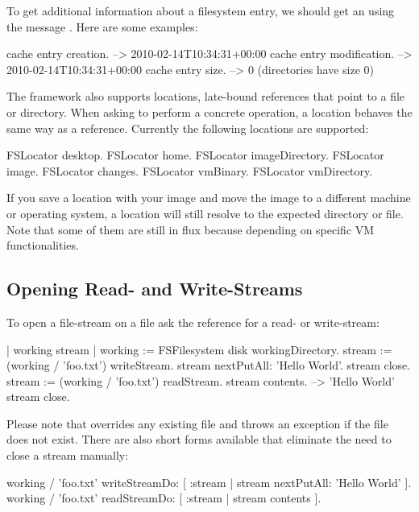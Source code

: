\documentclass[a4paper,10pt,twoside]{book}
\begin{document}
  
To get additional information about a filesystem entry, we should get an  using the message . Here are some examples:

\begin{code}{}
cache entry creation.		--> 2010-02-14T10:34:31+00:00
cache entry modification.	--> 2010-02-14T10:34:31+00:00
cache entry size.			--> 0 (directories have size 0)
\end{code} 

The framework also supports locations, late-bound references that point to a file or directory. When asking to perform a concrete operation, a location behaves the same way as a reference. Currently the following locations are supported:

\begin{code}{}
FSLocator desktop.
FSLocator home.
FSLocator imageDirectory.
FSLocator image.
FSLocator changes.
FSLocator vmBinary.
FSLocator vmDirectory.
\end{code} 

If you save a location with your image and move the image to a different machine or operating system, a location will still resolve to the expected directory or file. Note that some of them are still in flux because depending on specific VM functionalities. 

\subsection{Opening Read- and Write-Streams}
To open a file-stream on a file ask the reference for a read- or write-stream:

\begin{code}{}
| working stream |
working := FSFilesystem disk workingDirectory.
stream := (working / 'foo.txt') writeStream.
stream nextPutAll: 'Hello World'.
stream close.
stream := (working / 'foo.txt') readStream.
stream contents.			--> 'Hello World'
stream close.
\end{code}


Please note that  overrides any existing file and  throws an exception if the file does not exist. There are also short forms available that eliminate the need to close a stream manually:

\begin{code}{}
working / 'foo.txt' writeStreamDo: [ :stream | stream nextPutAll: 'Hello World' ].
working / 'foo.txt' readStreamDo: [ :stream | stream contents ].
\end{code}
\end{document}

